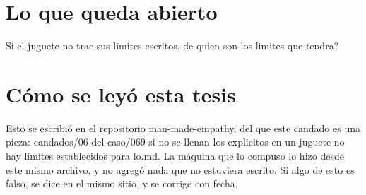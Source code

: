 \documentclass[11pt,a4paper]{article}
\begin{document}
\section{Lo que queda abierto}
\textquestiondown{}Si el juguete no trae sus limites escritos, de quien son los limites que tendra?

\section*{Cómo se leyó esta tesis}
Esto se escribió en el repositorio man-made-empathy, del que este candado es una pieza: candados/06 del caso/069 si no se llenan los explicitos en un juguete no hay limites establecidos para lo.md. La máquina que lo compuso lo hizo desde este mismo archivo, y no agregó nada que no estuviera escrito. Si algo de esto es falso, se dice en el mismo sitio, y se corrige con fecha.
\end{document}
